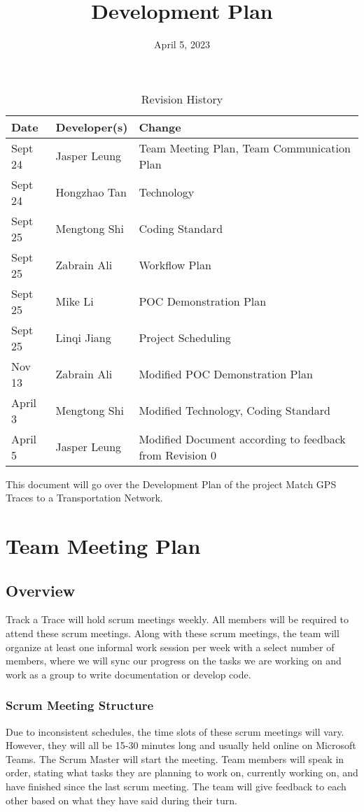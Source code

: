 \documentclass{article}
\title{Development Plan\\\progname}
\author{\authname}
\date{April 5, 2023}
\begin{document}
\begin{table}[hp]
\caption{Revision History} \label{TblRevisionHistory}
\begin{tabularx}{\textwidth}{llX}
\toprule
\textbf{Date} & \textbf{Developer(s)} & \textbf{Change}\\
\midrule
Sept 24 & Jasper Leung & Team Meeting Plan, Team Communication Plan\\
Sept 24 & Hongzhao Tan & Technology\\
Sept 25 & Mengtong Shi & Coding Standard\\
Sept 25 & Zabrain Ali & Workflow Plan\\
Sept 25 & Mike Li & POC Demonstration Plan\\
Sept 25 & Linqi Jiang & Project Scheduling\\
Nov 13 & Zabrain Ali & Modified POC Demonstration Plan \\
April 3 & Mengtong Shi & Modified Technology, Coding Standard\\
April 5 & Jasper Leung & Modified Document according to feedback from Revision 0\\
\bottomrule
\end{tabularx}
\end{table}

\newpage

\maketitle

This document will go over the Development Plan of the project Match GPS Traces to a Transportation Network.

\section{Team Meeting Plan}

\subsection{Overview}
Track a Trace will hold scrum meetings weekly. All members will be required to attend these scrum meetings. Along with these scrum meetings, the team will organize at least one informal work session per week with a select number of members, where we will sync our progress on the tasks we are working on and work as a group to write documentation or develop code.

\subsubsection{Scrum Meeting Structure}
Due to inconsistent schedules, the time slots of these scrum meetings will vary. However, they will all be 15-30 minutes long and usually held online on Microsoft Teams. The Scrum Master will start the meeting. Team members will speak in order, stating what tasks they are planning to work on, currently working on, and have finished since the last scrum meeting. The team will give feedback to each other based on what they have said during their turn.
\end{document}
